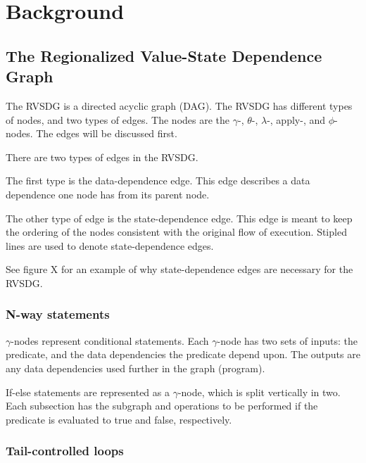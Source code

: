 
\section{Background}
\label{background}

\subsection{The Regionalized Value-State Dependence Graph}
\label{background:RVSDG}

The RVSDG is a directed acyclic graph (DAG). The RVSDG has different types of
nodes, and two types of edges. The nodes are the $\gamma$-, $\theta$-,
$\lambda$-, apply-, and $\phi$-nodes. The edges will be discussed first.


There are two types of edges in the RVSDG.

The first type is the data-dependence edge. This edge describes a data
dependence one node has from its parent node.

The other type of edge is the state-dependence edge. This edge is meant to keep
the ordering of the nodes consistent with the original flow of execution.
Stipled lines are used to denote state-dependence edges.

See figure X for an example of why state-dependence edges are necessary for the
RVSDG.

\subsubsection{N-way statements}

\textit{$\gamma$}-nodes represent conditional statements. Each
$\gamma$-node has two sets of inputs: the predicate, and the data dependencies
the predicate depend upon. The outputs are any data dependencies used further in
the graph (program).

If-else statements are represented as a $\gamma$-node, which is split vertically
in two. Each subsection has the subgraph and operations to be performed if the
predicate is evaluated to true and false, respectively.

\subsubsection{Tail-controlled loops}

